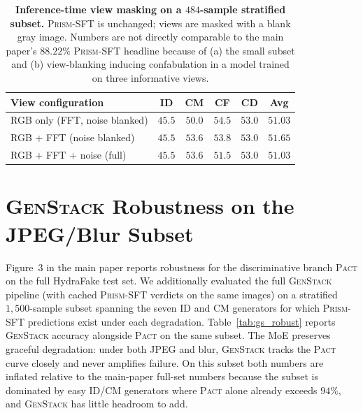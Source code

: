 \documentclass[10pt,twocolumn,letterpaper]{article}
\newcommand{\vfive}{\textsc{Pact}}
\newcommand{\prism}{\textsc{Prism-SFT}}
\begin{document}
\begin{table}[h]
\centering
\footnotesize
\setlength{\tabcolsep}{4pt}
\caption{\textbf{Inference-time view masking on a $484$-sample stratified subset.} \prism{} is unchanged; views are masked with a blank gray image. Numbers are not directly comparable to the main paper's $88.22\%$ \prism{} headline because of (a) the small subset and (b) view-blanking inducing confabulation in a model trained on three informative views.}
\label{tab:view_mask}
\begin{tabular}{l c c c c c}
\toprule
View configuration & ID & CM & CF & CD & Avg \\
\midrule
RGB only (FFT, noise blanked) & $45.5$ & $50.0$ & $54.5$ & $53.0$ & $51.03$ \\
RGB + FFT (noise blanked)     & $45.5$ & $53.6$ & $53.8$ & $53.0$ & $51.65$ \\
RGB + FFT + noise (full)      & $45.5$ & $53.6$ & $51.5$ & $53.0$ & $51.03$ \\
\bottomrule
\end{tabular}
\end{table}

\section{\textsc{GenStack} Robustness on the JPEG/Blur Subset}
\label{sec:gs_robust}

Figure~3 in the main paper reports robustness for the discriminative branch \vfive{} on the full HydraFake test set. We additionally evaluated the full \textsc{GenStack} pipeline (with cached \prism{} verdicts on the same images) on a stratified $1{,}500$-sample subset spanning the seven ID and CM generators for which \prism{} predictions exist under each degradation. Table~\ref{tab:gs_robust} reports \textsc{GenStack} accuracy alongside \vfive{} on the same subset. The MoE preserves graceful degradation: under both JPEG and blur, \textsc{GenStack} tracks the \vfive{} curve closely and never amplifies failure. On this subset both numbers are inflated relative to the main-paper full-set numbers because the subset is dominated by easy ID/CM generators where \vfive{} alone already exceeds $94\%$, and \textsc{GenStack} has little headroom to add.
\end{document}
